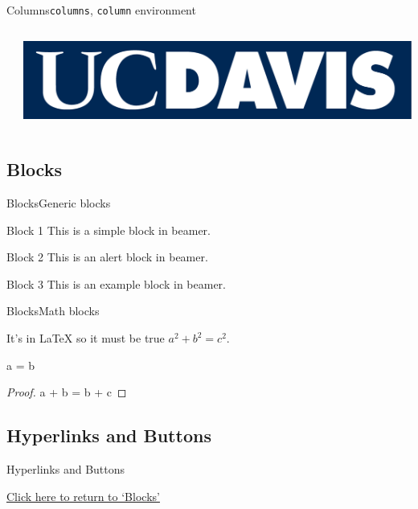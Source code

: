 \documentclass{beamer}
\begin{document}
\begin{frame}{Columns}{\texttt{columns}, \texttt{column} environment}
\begin{columns}
    \begin{column}{0.5\textwidth} %
        \tiny{\lipsum[1-1]}
    \end{column}

    \begin{column}{0.5\textwidth} %
        \includegraphics[width=0.9\columnwidth]{DavisLogoV3.png}
    \end{column}
\end{columns}
\end{frame}

\subsection{Blocks}

\label{Blocks}
\begin{frame}{Blocks}{Generic blocks}

\begin{block}{Block 1}
This is a simple block in beamer.
\end{block}

\begin{alertblock}{Block 2}
This is an alert block in beamer.
\end{alertblock}

\begin{exampleblock}{Block 3}
This is an example block in beamer.
\end{exampleblock}

\end{frame}


\begin{frame}{Blocks}{Math blocks}

\begin{theorem}
    It's in \LaTeX{} so it must be true $ a^2 + b^2 = c^2$.
\end{theorem}
\begin{corollary}
    a = b
\end{corollary}
\begin{proof}
    a + b = b + c
\end{proof}

\end{frame}

\subsection{Hyperlinks and Buttons}

\begin{frame}{Hyperlinks and Buttons}

    \hyperlink{Blocks}{Click here to return to `Blocks'}

    \hyperlink{Outline}{}

\end{frame}
\end{document}

